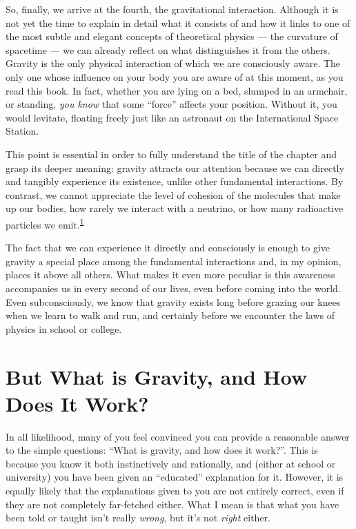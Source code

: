 So, finally, we arrive at the fourth, the gravitational interaction. Although it is not
yet the time to explain in detail what it consists of and how it links to one of the
most subtle and elegant concepts of theoretical physics --- the curvature of spacetime
--- we can already reflect on what distinguishes it from the others. Gravity is the only
physical interaction of which we are consciously aware. The only one whose influence on
your body you are aware of at this moment, as you read this book. In fact, whether you
are lying on a bed, slumped in an armchair, or standing, \emph{you know} that some
``force'' affects your position. Without it, you would levitate, floating freely just
like an astronaut on the International Space Station.

This point is essential in order to fully understand the title of the chapter and grasp
its deeper meaning: gravity attracts our attention because we can directly and tangibly
experience its existence, unlike other fundamental interactions. By contrast, we cannot
appreciate the level of cohesion of the molecules that make up our bodies, how rarely we
interact with a neutrino, or how many radioactive particles we
emit.\textsuperscript{\hyperlink{note:01-01}{1}}

The fact that we can experience it directly and consciously is enough to give gravity a
special place among the fundamental interactions and, in my opinion, places it above all
others. What makes it even more peculiar is this awareness accompanies us in every
second of our lives, even before coming into the world. Even subconsciously, we know
that gravity exists long before grazing our knees when we learn to walk and run, and
certainly before we encounter the laws of physics in school or college.

\section{But What is Gravity, and How Does It Work?}\label{sec:01-gravity}

In all likelihood, many of you feel convinced you can provide a reasonable answer to the
simple questions: ``What is gravity, and how does it work?''. This is because you know
it both instinctively and rationally, and (either at school or university) you have been
given an ``educated'' explanation for it. However, it is equally likely that the
explanations given to you are not entirely correct, even if they are not completely
far-fetched either. What I mean is that what you have been told or taught isn't really
\emph{wrong}, but it's not \emph{right} either.

